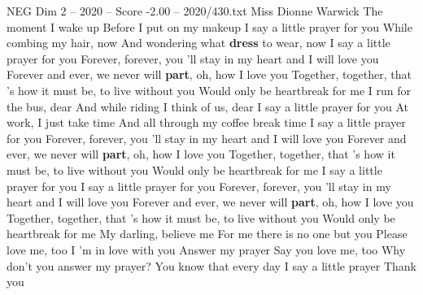 \begin{textsample}{NEG Dim 2 – 2020 – Score -2.00 – 2020/430.txt}  \label{ex:f2_neg_023}
Miss Dionne Warwick The moment I wake up Before I put on my makeup I say a little prayer for you While combing my hair, now And wondering what \textbf{dress} to wear, now I say a little prayer for you Forever, forever, you 'll stay in my heart and I will love you Forever and ever, we never will \textbf{part}, oh, how I love you Together, together, that 's how it must be, to live without you Would only be heartbreak for me I run for the bus, dear And while riding I think of us, dear I say a little prayer for you At work, I just take time And all through my coffee break time I say a little prayer for you Forever, forever, you 'll stay in my heart and I will love you Forever and ever, we never will \textbf{part}, oh, how I love you Together, together, that 's how it must be, to live without you Would only be heartbreak for me I say a little prayer for you I say a little prayer for you Forever, forever, you 'll stay in my heart and I will love you Forever and ever, we never will \textbf{part}, oh, how I love you Together, together, that 's how it must be, to live without you Would only be heartbreak for me My darling, believe me For me there is no one but you Please love me, too I 'm in love with you Answer my prayer Say you love me, too Why don't you answer my prayer?
You know that every day I say a little prayer Thank you

\end{textsample}
